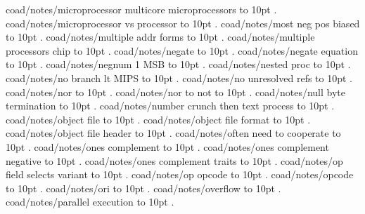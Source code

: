 \smallskip
coad/notes/microprocessor multicore microprocessors \leaders\hbox to 10pt {\hss.\hss}  \hfill {}
\smallskip
coad/notes/microprocessor vs processor \leaders\hbox to 10pt {\hss.\hss}  \hfill {}
\smallskip
coad/notes/most neg pos biased \leaders\hbox to 10pt {\hss.\hss}  \hfill {}
\smallskip
coad/notes/multiple addr forms \leaders\hbox to 10pt {\hss.\hss}  \hfill {}
\smallskip
coad/notes/multiple processors chip \leaders\hbox to 10pt {\hss.\hss}  \hfill {}
\smallskip
coad/notes/negate \leaders\hbox to 10pt {\hss.\hss}  \hfill {}
\smallskip
coad/notes/negate equation \leaders\hbox to 10pt {\hss.\hss}  \hfill {}
\smallskip
coad/notes/negnum 1 MSB \leaders\hbox to 10pt {\hss.\hss}  \hfill {}
\smallskip
coad/notes/nested proc \leaders\hbox to 10pt {\hss.\hss}  \hfill {}
\smallskip
coad/notes/no branch lt MIPS \leaders\hbox to 10pt {\hss.\hss}  \hfill {}
\smallskip
coad/notes/no unresolved refs \leaders\hbox to 10pt {\hss.\hss}  \hfill {}
\smallskip
coad/notes/nor \leaders\hbox to 10pt {\hss.\hss}  \hfill {}
\smallskip
coad/notes/nor to not \leaders\hbox to 10pt {\hss.\hss}  \hfill {}
\smallskip
coad/notes/null byte termination \leaders\hbox to 10pt {\hss.\hss}  \hfill {}
\smallskip
coad/notes/number crunch then text process \leaders\hbox to 10pt {\hss.\hss}  \hfill {}
\smallskip
coad/notes/object file \leaders\hbox to 10pt {\hss.\hss}  \hfill {}
\smallskip
coad/notes/object file format \leaders\hbox to 10pt {\hss.\hss}  \hfill {}
\smallskip
coad/notes/object file header \leaders\hbox to 10pt {\hss.\hss}  \hfill {}
\smallskip
coad/notes/often need to cooperate \leaders\hbox to 10pt {\hss.\hss}  \hfill {}
\smallskip
coad/notes/ones complement \leaders\hbox to 10pt {\hss.\hss}  \hfill {}
\smallskip
coad/notes/ones complement negative \leaders\hbox to 10pt {\hss.\hss}  \hfill {}
\smallskip
coad/notes/ones complement traits \leaders\hbox to 10pt {\hss.\hss}  \hfill {}
\smallskip
coad/notes/op field selects variant \leaders\hbox to 10pt {\hss.\hss}  \hfill {}
\smallskip
coad/notes/op opcode \leaders\hbox to 10pt {\hss.\hss}  \hfill {}
\smallskip
coad/notes/opcode \leaders\hbox to 10pt {\hss.\hss}  \hfill {}
\smallskip
coad/notes/ori \leaders\hbox to 10pt {\hss.\hss}  \hfill {}
\smallskip
coad/notes/overflow \leaders\hbox to 10pt {\hss.\hss}  \hfill {}
\smallskip
coad/notes/parallel execution \leaders\hbox to 10pt {\hss.\hss}  \hfill {}
